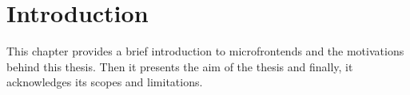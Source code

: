 \chapter{Introduction}
\label{chap:Introduction} 
This chapter provides a brief introduction to microfrontends and the motivations behind this thesis. Then it presents the aim of the thesis and finally, it acknowledges its scopes and limitations.



